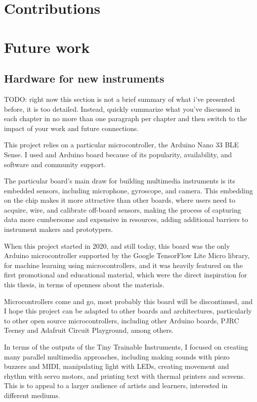 \section{Contributions}


\section{Future work}

\subsection{Hardware for new instruments}

TODO: right now this section is not a brief summary of what i’ve presented before, it is too detailed. Instead, quickly summarize what you've discussed in each chapter in no more than one paragraph per chapter and then switch to the impact of your work and future connections.

This project relies on a particular microcontroller, the Arduino Nano 33 BLE Sense. I used and Arduino board because of its popularity, availability, and software and community support.

The particular board's main draw for building multimedia instruments is its embedded sensors, including microphone, gyroscope, and camera. This embedding on the chip makes it more attractive than other boards, where users need to acquire, wire, and calibrate off-board sensors, making the process of capturing data more cumbersome and expensive in resources, adding additional barriers to instrument makers and prototypers. 

When this project started in 2020, and still today, this board was the only Arduino microcontroller supported by the Google TensorFlow Lite Micro library, for machine learning using microcontrollers, and it was heavily featured on the first promotional and educational material, which were the direct inspiration for this thesis, in terms of openness about the materials.

Microcontrollers come and go, most probably this board will be discontinued, and I hope this project can be adapted to other boards and architectures, particularly to other open source microcontrollers, including other Arduino boards, PJRC Teensy and Adafruit Circuit Playground, among others.

In terms of the outputs of the Tiny Trainable Instruments, I focused on creating many parallel multimedia approaches, including making sounds with piezo buzzers and MIDI, manipulating light with LEDs, creating movement and rhythm with servo motors, and printing text with thermal printers and screens. This is to appeal to a larger audience of artists and learners, interested in different mediums.

